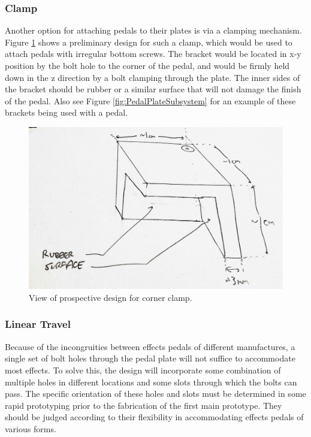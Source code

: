 \documentclass{article}
\begin{document}
		\subsubsection{Clamp}
		Another option for attaching pedals to their plates is via a clamping mechanism.  Figure \ref{fig:CornerClamp} shows a preliminary design for such a clamp, which would be used to attach pedals with irregular bottom screws.  The bracket would be located in x-y position by the bolt hole to the corner of the pedal, and would be firmly held down in the z direction by a bolt clamping through the plate. The inner sides of the bracket should be rubber or a similar surface that will not damage the finish of the pedal.  Also see Figure \ref{fig:PedalPlateSubsystem} for an example of these brackets being used with a pedal.

		\begin{figure}
			\centering
			\includegraphics[width = 0.6 \textwidth]{CornerBracketPerspective.jpg}
			\caption{View of prospective design for corner clamp.}
			\label{fig:CornerClamp}
		\end{figure}

		\subsubsection{Linear Travel}
		Because of the incongruities between effects pedals of different manufactures, a single set of bolt holes through the pedal plate will not suffice to accommodate most effects.  To solve this, the design will incorporate some combination of multiple holes in different locations and some slots through which the bolts can pass.  The specific orientation of these holes and slots must be determined in some rapid prototyping prior to the fabrication of the first main prototype.  They should be judged according to their flexibility in accommodating effects pedals of various forms.
\end{document}
